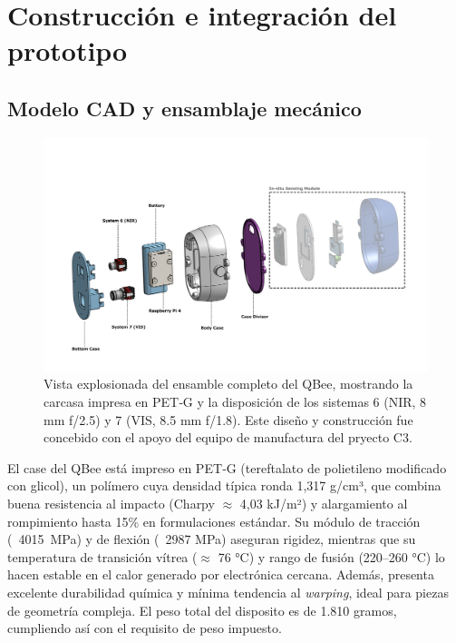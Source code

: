 \section{Construcción e integración del prototipo}
  \subsection{Modelo CAD y ensamblaje mecánico}

    \begin{figure}[h]
        \centering
        \includegraphics[width=1\linewidth]{Figures/C4/QBee.pdf}
        \caption{Vista explosionada del ensamble completo del QBee, mostrando la carcasa impresa en PET‑G y la disposición de los sistemas 6 (NIR, 8 mm f/2.5) y 7 (VIS, 8.5 mm f/1.8). Este diseño y construcción fue concebido con el apoyo del equipo de manufactura del pryecto C3.}
        \label{fig:exploded_assembly}
    \end{figure}

    El case del QBee está impreso en PET‑G (tereftalato de polietileno modificado con glicol), un polímero cuya densidad típica ronda 1,317 g/cm³, que combina buena resistencia al impacto (Charpy $\approx$ 4,03 kJ/m²) y alargamiento al rompimiento hasta 15\% en formulaciones estándar. Su módulo de tracción (~4015 MPa) y de flexión (~2987 MPa) aseguran rigidez, mientras que su temperatura de transición vítrea ($\approx$ 76 °C) y rango de fusión (220–260 °C) lo hacen estable en el calor generado por electrónica cercana. Además, presenta excelente durabilidad química y mínima tendencia al \emph{warping}, ideal para piezas de geometría compleja. El peso total del disposito es de 1.810 gramos, cumpliendo así con el requisito de peso impuesto.\\

